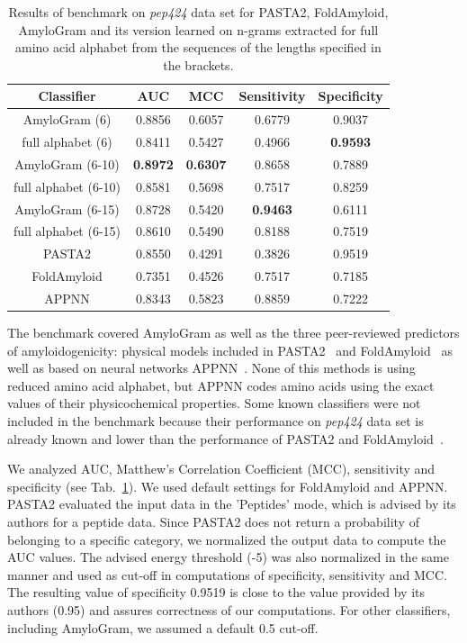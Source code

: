 \documentclass[fleqn,10pt,twoside]{gcb15submission}
\begin{document}
\begin{table}[ht]
\centering
\small
\caption{Results of benchmark on \textit{pep424} data set for PASTA2, 
FoldAmyloid, AmyloGram and its version learned on n-grams extracted for full amino acid alphabet from the sequences of the lengths specified in 
the brackets.} 
\label{tab:bench_summary}
\begin{tabular}{ccccc}
  \toprule
Classifier & AUC & MCC & Sensitivity & Specificity \\ 
  \midrule
AmyloGram (6) & 0.8856 & 0.6057 & 0.6779 & 0.9037 \\
   \rowcolor[gray]{0.85}full alphabet (6) & 0.8411 & 0.5427 & 0.4966 & 
\textbf{0.9593} \\ 

AmyloGram (6-10) & \textbf{0.8972} & \textbf{0.6307} & 
0.8658 & 0.7889 \\ 
  \rowcolor[gray]{0.85}full alphabet (6-10) & 0.8581 & 0.5698 & 0.7517 & 0.8259 
\\ 
AmyloGram (6-15) & 0.8728 & 0.5420 & \textbf{0.9463} & 0.6111 \\
   \rowcolor[gray]{0.85}full alphabet (6-15) & 0.8610 & 0.5490 & 0.8188 & 
0.7519 \\ 
\hline \hline
  PASTA2 & 0.8550 & 0.4291 & 0.3826 & 0.9519 \\ 
   \rowcolor[gray]{0.85}FoldAmyloid & 0.7351 & 0.4526 & 0.7517 & 0.7185 \\ 
  APPNN & 0.8343 & 0.5823 & 0.8859 & 0.7222 \\ 
   \bottomrule
\end{tabular}
\end{table}

The benchmark covered AmyloGram as well as the three peer-reviewed predictors of 
amyloidogenicity: physical models included in PASTA2~\citep{walsh_pasta_2014} and 
FoldAmyloid~\citep{garbuzynskiy_foldamyloid:_2010} as well as based on neural networks 
APPNN~\citep{familia_prediction_2015}. None of this methods is using 
reduced amino acid alphabet, but APPNN codes amino acids using the exact 
values of their physicochemical properties. Some known classifiers were 
not included in the benchmark because their performance on \textit{pep424} 
data set is already known and lower than the performance of PASTA2 and 
FoldAmyloid~\citep{walsh_pasta_2014}.

  We analyzed AUC, Matthew's Correlation Coefficient (MCC), sensitivity and 
specificity (see Tab.~\ref{tab:bench_summary}). We used default settings for 
FoldAmyloid and APPNN. PASTA2 evaluated the input data in the 'Peptides' mode, 
which is advised by its authors for a peptide data. Since PASTA2 does not 
return a probability of belonging to a specific 
category, we normalized the output data to compute the AUC values. The advised 
energy threshold (-5) was also normalized in the same manner and used as cut-off 
in computations of specificity, sensitivity and MCC. The resulting value of 
specificity 0.9519 is close to the value provided by its authors (0.95) and 
assures correctness of our computations. For other classifiers, including 
AmyloGram, we assumed a default 0.5 cut-off.
    
\end{document}
